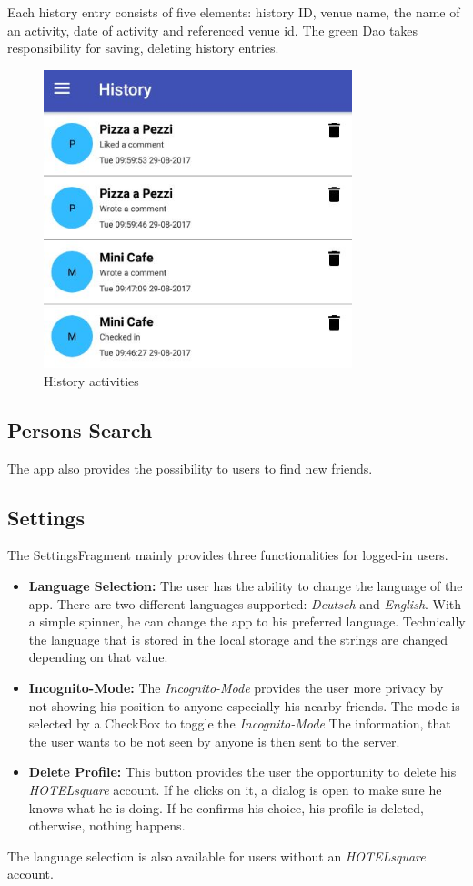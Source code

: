 Each history entry consists of five elements: history ID, venue name, the name of an activity, date of activity and referenced venue id. The green Dao takes responsibility for saving, deleting history entries.
\begin{figure}[htbp]
	\includegraphics[width=0.8\textwidth]{images/history.jpg}
	\centering
	\caption{History activities}\label{fig:history}
\end{figure}

\subsection{Persons Search}
The app also provides the possibility to users to find new friends. 
\subsection{Settings}
The SettingsFragment mainly provides three functionalities for logged-in users.

\begin{itemize}
\item \textbf{Language Selection:} The user has the ability to change the language of the app. There are two different languages supported: \textit{Deutsch} and \textit{English}. With a simple spinner, he can change the app to his preferred language. Technically the language that is stored in the local storage and the strings are changed depending on that value.
\item \textbf{Incognito-Mode:} The \textit{Incognito-Mode} provides the user more privacy by not showing his position to anyone especially his nearby friends. The mode is selected by a CheckBox to toggle the \textit{Incognito-Mode} The information, that the user wants to be not seen by anyone is then sent to the server.
\item \textbf{Delete Profile:} This button provides the user the opportunity to delete his \textit{HOTELsquare} account. If he clicks on it, a dialog is open to make sure he knows what he is doing. If he confirms his choice, his profile is deleted, otherwise, nothing happens.
\end{itemize}

The language selection is also available for users without an \textit{HOTELsquare} account.


